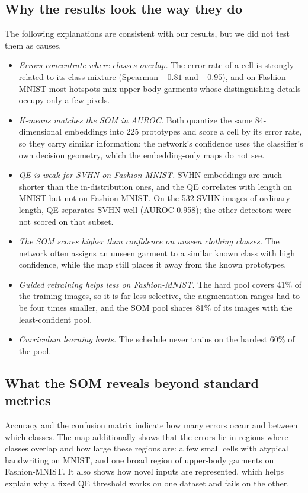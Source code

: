 \documentclass[preprint,review,12pt]{elsarticle}
\begin{document}
\subsection{Why the results look the way they do}
The following explanations are consistent with our results, but we did not test them as causes.
\begin{itemize}
  \item \emph{Errors concentrate where classes overlap.} The error rate of a cell is strongly related to its class mixture (Spearman $-0.81$ and $-0.95$), and on Fashion-MNIST most hotspots mix upper-body garments whose distinguishing details occupy only a few pixels.
  \item \emph{K-means matches the SOM in AUROC.} Both quantize the same 84-dimensional embeddings into 225 prototypes and score a cell by its error rate, so they carry similar information; the network's confidence uses the classifier's own decision geometry, which the embedding-only maps do not see.
  \item \emph{QE is weak for SVHN on Fashion-MNIST.} SVHN embeddings are much shorter than the in-distribution ones, and the QE correlates with length on MNIST but not on Fashion-MNIST. On the 532 SVHN images of ordinary length, QE separates SVHN well (AUROC 0.958); the other detectors were not scored on that subset.
  \item \emph{The SOM scores higher than confidence on unseen clothing classes.} The network often assigns an unseen garment to a similar known class with high confidence, while the map still places it away from the known prototypes.
  \item \emph{Guided retraining helps less on Fashion-MNIST.} The hard pool covers 41\% of the training images, so it is far less selective, the augmentation ranges had to be four times smaller, and the SOM pool shares 81\% of its images with the least-confident pool.
  \item \emph{Curriculum learning hurts.} The schedule never trains on the hardest 60\% of the pool.
\end{itemize}

\subsection{What the SOM reveals beyond standard metrics}
Accuracy and the confusion matrix indicate how many errors occur and between which classes. The map additionally shows that the errors lie in regions where classes overlap and how large these regions are: a few small cells with atypical handwriting on MNIST, and one broad region of upper-body garments on Fashion-MNIST. It also shows how novel inputs are represented, which helps explain why a fixed QE threshold works on one dataset and fails on the other.
\end{document}
